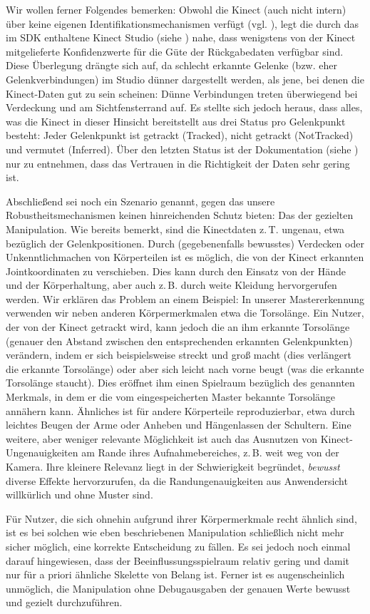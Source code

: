 	Wir wollen ferner Folgendes bemerken: Obwohl die Kinect (auch nicht intern) über keine eigenen Identifikationsmechanismen verfügt (vgl. \cite{bodyprop}), legt die durch das im SDK enthaltene Kinect Studio (siehe \cite{kinectsdk}) nahe, dass wenigstens von der Kinect mitgelieferte Konfidenzwerte für die Güte der Rückgabedaten verfügbar sind. Diese Überlegung drängte sich auf, da schlecht erkannte Gelenke (bzw. eher Gelenkverbindungen) im Studio dünner dargestellt werden, als jene, bei denen die Kinect-Daten gut zu sein scheinen: Dünne Verbindungen treten überwiegend bei Verdeckung und am Sichtfensterrand auf. Es stellte sich jedoch heraus, dass alles, was die Kinect in dieser Hinsicht bereitstellt aus drei Status pro Gelenkpunkt besteht: Jeder Gelenkpunkt ist getrackt (\glqq Tracked\grqq), nicht getrackt (\glqq NotTracked\grqq) und vermutet (\glqq Inferred\grqq). Über den letzten Status ist der Dokumentation (siehe \cite{trackingstate}) nur zu entnehmen, dass das Vertrauen in die Richtigkeit der Daten \glqq sehr gering\grqq{} ist.\par\bigskip
	Abschließend sei noch ein Szenario genannt, gegen das unsere Robustheitsmechanismen keinen hinreichenden Schutz bieten: Das der gezielten Manipulation. Wie bereits bemerkt, sind die Kinectdaten z.\,T. ungenau, etwa bezüglich der Gelenkpositionen. Durch (gegebenenfalls bewusstes) Verdecken oder Unkenntlichmachen von Körperteilen ist es möglich, die von der Kinect erkannten Jointkoordinaten zu verschieben. Dies kann durch den Einsatz von der Hände und der Körperhaltung, aber auch z.\,B. durch weite Kleidung hervorgerufen werden. Wir erklären das Problem an einem Beispiel: In unserer Mastererkennung verwenden wir neben anderen Körpermerkmalen etwa die Torsolänge. Ein Nutzer, der von der Kinect getrackt wird, kann jedoch die an ihm erkannte Torsolänge (genauer den Abstand zwischen den entsprechenden erkannten Gelenkpunkten) verändern, indem er sich beispielsweise streckt und \glqq groß macht\grqq{} (dies verlängert die erkannte Torsolänge) oder aber sich leicht nach vorne beugt (was die erkannte Torsolänge staucht). Dies eröffnet ihm einen Spielraum bezüglich des genannten Merkmals, in dem er die vom eingespeicherten Master bekannte Torsolänge annähern kann. Ähnliches ist für andere Körperteile reproduzierbar, etwa durch leichtes Beugen der Arme oder Anheben und Hängenlassen der Schultern. Eine weitere, aber weniger relevante Möglichkeit ist auch das Ausnutzen von Kinect-Ungenauigkeiten am Rande ihres Aufnahmebereiches, z.\,B. weit weg von der Kamera. Ihre kleinere Relevanz liegt in der Schwierigkeit begründet, \emph{bewusst} diverse Effekte hervorzurufen, da die Randungenauigkeiten aus Anwendersicht willkürlich und ohne Muster sind.\par
	Für Nutzer, die sich ohnehin aufgrund ihrer Körpermerkmale recht ähnlich sind, ist es bei solchen wie eben beschriebenen Manipulation schließlich nicht mehr sicher möglich, eine korrekte Entscheidung zu fällen. Es sei jedoch noch einmal darauf hingewiesen, dass der Beeinflussungsspielraum relativ gering und damit nur für a priori ähnliche Skelette von Belang ist. Ferner ist es augenscheinlich unmöglich, die Manipulation ohne Debugausgaben der genauen Werte bewusst und gezielt durchzuführen.

